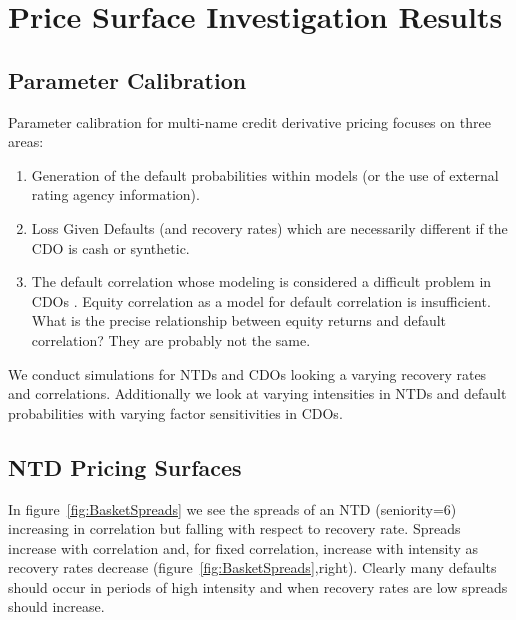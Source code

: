 \chapter{Price Surface Investigation Results}\label{chap:study}


\section{Parameter Calibration}\label{sec:param_cal}

Parameter calibration for multi-name credit derivative pricing focuses on three areas:
\begin{enumerate}
\item Generation of the default probabilities within models (or the use of external rating agency information).
\item Loss Given Defaults (and recovery rates) which are necessarily different if the CDO is cash or synthetic.
\item The default correlation whose modeling is considered a difficult problem in CDOs \cite{Gib2004}. Equity correlation as a model for default correlation is insufficient.  What is the precise relationship between equity returns and default correlation?  They are probably not the same.
\end{enumerate}

We conduct simulations for NTDs and CDOs looking a varying recovery rates and correlations.  Additionally we look at varying intensities in NTDs and default probabilities with varying factor sensitivities in CDOs.

\section{NTD Pricing Surfaces}\label{sec:ntd_surface}

In figure~\ref{fig:BasketSpreads} we see the spreads of an NTD (seniority=6) increasing in correlation but falling with respect to recovery rate. Spreads increase with correlation and, for fixed correlation, increase with intensity as recovery rates decrease (figure~\ref{fig:BasketSpreads},right).  Clearly many defaults should occur in periods of high intensity and when recovery rates are low spreads should increase.

